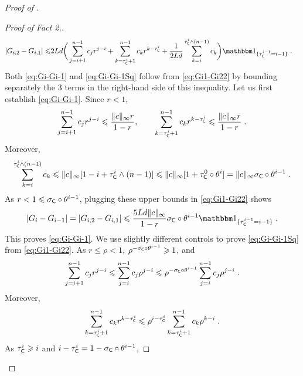 \documentclass[leqno,11pt,a4paper]{article}
\begin{document}
\begin{proof}[Proof of ]
\begin{proof}[Proof of Fact 2.]
\begin{align}
\label{eq:Gi1-Gi22} |G_{i,2}-G_{i,1}|\leqslant &2Ld\bigg(\sum_{j=i+1}^{n-1}c_jr^{j-i}+\sum_{k=\tau_{\cC}^i+1}^{n-1}c_kr^{k-\tau_{\cC}^i}+\frac1{2Ld}\sum_{k=i}^{\tau_{\cC}^i\wedge (n-1)}c_k\bigg)\indiacc{\tau_{\cC}^{i-1}=i-1}\eqsp.
\end{align}
Both \eqref{eq:Gi-Gi-1} and \eqref{eq:Gi-Gi-1Sq} follow from \eqref{eq:Gi1-Gi22} by bounding separately the $3$ terms in the right-hand side of this inequality.
Let us first establish \eqref{eq:Gi-Gi-1}.
Since $r<1$,
\[
\sum_{j=i+1}^{n-1}c_jr^{j-i}\leqslant \frac{\|c\|_\infty r}{1-r},\qquad \sum_{k=\tau_{\mathsf{C}}^i+1}^{n-1}c_kr^{k-\tau_{\mathsf{C}}^i}\leqslant \frac{\|c\|_\infty r}{1-r}\;.
\]
Moreover,
\[
\sum_{k=i}^{\tau_{\mathsf{C}}^i\wedge (n-1)}c_k\leqslant \|c\|_{\infty}[1-i+\tau_{\mathsf{C}}^i\wedge (n-1) ]\leqslant \|c\|_{\infty}[1+\tau_{\mathsf{C}}^0\circ \theta^i]=\|c\|_{\infty}\sigma_{\mathsf{C}}\circ\theta^{i-1}\;.
\]
As $r<1\leqslant \sigma_{\mathsf{C}}\circ\theta^{i-1}$, plugging these upper bounds in \eqref{eq:Gi1-Gi22} shows
\[
|G_{i}-G_{i-1}|=|G_{i,2}-G_{i,1}|\leqslant \frac{5Ld\|c\|_{\infty}}{1-r}\sigma_{\cC}\circ\theta^{i-1}\indiacc{\tau_{\cC}^{i-1}=i-1}\eqsp.
\]
This proves \eqref{eq:Gi-Gi-1}.
We use slightly different controls to prove \eqref{eq:Gi-Gi-1Sq} from \eqref{eq:Gi1-Gi22}.
As $r\leqslant \rho<1$, $\rho^{-\sigma_{\mathsf{C}}\circ\theta^{i-1}}\geqslant 1$, and
\begin{align}
\label{eq:Step1Var} \sum_{j=i+1}^{n-1}c_jr^{j-i}\leqslant \sum_{j=i}^{n-1}c_j\rho^{j-i}\leqslant \rho^{-\sigma_{\mathsf{C}}\circ\theta^{i-1}}\sum_{j=i}^{n-1}c_j\rho^{j-i}\;.
\end{align}
Moreover,
\begin{align*}
 \sum_{k=\tau_{\mathsf{C}}^i+1}^{n-1}c_kr^{k-\tau_{\mathsf{C}}^i}\leqslant\rho^{i-\tau_{\mathsf{C}}^i}\sum_{k=\tau_{\mathsf{C}}^i+1}^{n-1}c_k\rho^{k-i}\;.
\end{align*}
As $\tau_{\mathsf{C}}^i\geqslant i$ and $i-\tau_{\mathsf{C}}^i=1-\sigma_{\mathsf{C}}\circ\theta^{i-1}$,

\end{proof}
\end{proof}
\end{document}
